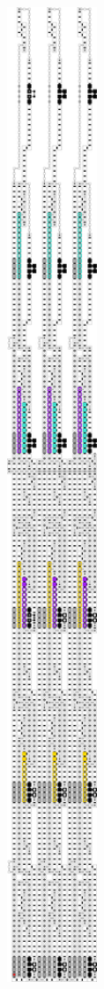 \begin{figure}[H]
    \centering
    \begin{subfigure}[t]{0.3\textwidth}
        \centering
        \includegraphics[width=0.3\textwidth]{full_overview_case3_colored}

\end{subfigure}
\end{figure}
